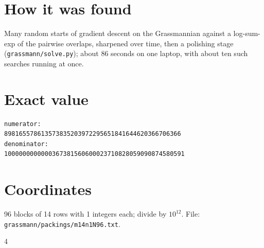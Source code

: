 \documentclass[11pt,a4paper]{article}
\begin{document}
\section{How it was found}
Many random starts of gradient descent on the Grassmannian against a log-sum-exp of the pairwise overlaps, sharpened over time, then a polishing stage (\texttt{grassmann/solve.py}); about 86 seconds on one laptop, with about ten such searches running at once.


\appendix
\section{Exact value}
{\small
\begin{verbatim}
numerator:
898165578613573835203972295651841644620366706366
denominator:
1000000000000367381560600023710828059090874580591
\end{verbatim}}

\section{Coordinates}
96 blocks of 14 rows with 1 integers each; divide by $10^{12}$. File: \texttt{grassmann/packings/m14n1N96.txt}.
{\tiny
\begin{multicols}{4}
\end{multicols}}
\end{document}
